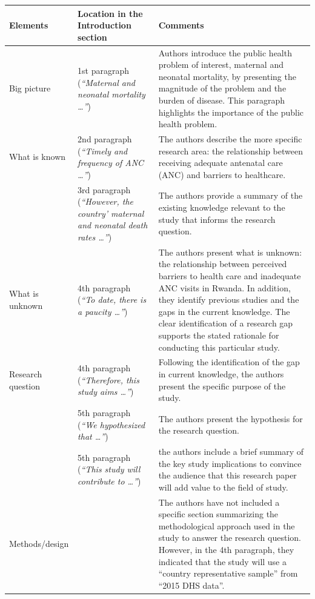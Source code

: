 \documentclass[
]{book}
\begin{document}
\begin{longtable}[]{@{}
  >{\raggedright\arraybackslash}p{}
  >{\centering\arraybackslash}p{}
  >{\raggedright\arraybackslash}p{}@{}}
\toprule
Elements & Location in the Introduction section & Comments \\
\midrule
\endhead
Big picture & 1st paragraph (\emph{``Maternal and neonatal mortality \ldots{}''}) & Authors introduce the public health problem of interest, maternal and neonatal mortality, by presenting the magnitude of the problem and the burden of disease. This paragraph highlights the importance of the public health problem. \\
What is known & 2nd paragraph (\emph{``Timely and frequency of ANC \ldots{}''}) & The authors describe the more specific research area: the relationship between receiving adequate antenatal care (ANC) and barriers to healthcare. \\
& 3rd paragraph (\emph{``However, the country' maternal and neonatal death rates \ldots{}''}) & The authors provide a summary of the existing knowledge relevant to the study that informs the research question. \\
What is unknown & 4th paragraph (\emph{``To date, there is a paucity \ldots{}''}) & The authors present what is unknown: the relationship between perceived barriers to health care and inadequate ANC visits in Rwanda. In addition, they identify previous studies and the gaps in the current knowledge. The clear identification of a research gap supports the stated rationale for conducting this particular study. \\
Research question & 4th paragraph (\emph{``Therefore, this study aims \ldots{}''}) & Following the identification of the gap in current knowledge, the authors present the specific purpose of the study. \\
& 5th paragraph (\emph{``We hypothesized that \ldots{}''}) & The authors present the hypothesis for the research question. \\
& 5th paragraph (\emph{``This study will contribute to \ldots{}''}) & the authors include a brief summary of the key study implications to convince the audience that this research paper will add value to the field of study. \\
Methods/design & & The authors have not included a specific section summarizing the methodological approach used in the study to answer the research question. However, in the 4th paragraph, they indicated that the study will use a ``country representative sample'' from ``2015 DHS data''. \\
\bottomrule
\end{longtable}
\end{document}
